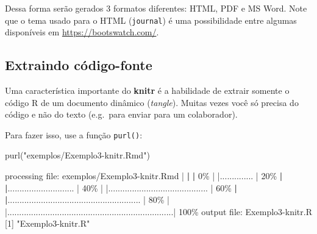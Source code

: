 \documentclass[
  10pt,
  a4paper]{book}
\newenvironment{Shaded}{\begin{snugshade}}{\end{snugshade}}
\newcommand{\DecValTok}[1]{\textcolor[rgb]{0.00,0.00,0.81}{#1}}
\newcommand{\ErrorTok}[1]{\textcolor[rgb]{0.64,0.00,0.00}{\textbf{#1}}}
\newcommand{\FunctionTok}[1]{\textcolor[rgb]{0.00,0.00,0.00}{#1}}
\newcommand{\NormalTok}[1]{#1}
\newcommand{\SpecialCharTok}[1]{\textcolor[rgb]{0.00,0.00,0.00}{#1}}
\newcommand{\StringTok}[1]{\textcolor[rgb]{0.31,0.60,0.02}{#1}}
\begin{document}
Dessa forma serão gerados 3 formatos diferentes: HTML, PDF e MS Word.
Note que o tema usado para o HTML (\texttt{journal}) é uma possibilidade entre
algumas disponíveis em \url{https://bootswatch.com/}.

\hypertarget{extraindo-cuxf3digo-fonte}{%
\subsection{Extraindo código-fonte}\label{extraindo-cuxf3digo-fonte}}

Uma característica importante do \textbf{knitr} é a habilidade de extrair
somente o código R de um documento dinâmico (\emph{tangle}). Muitas vezes
você só precisa do código e não do texto (e.g.~para enviar para um
colaborador).

Para fazer isso, use a função \texttt{purl()}:

\begin{Shaded}
\begin{Highlighting}[]
\FunctionTok{purl}\NormalTok{(}\StringTok{"exemplos/Exemplo3{-}knitr.Rmd"}\NormalTok{)}


\NormalTok{processing file}\SpecialCharTok{:}\NormalTok{ exemplos}\SpecialCharTok{/}\NormalTok{Exemplo3}\SpecialCharTok{{-}}\NormalTok{knitr.Rmd}
  \SpecialCharTok{|}                                                                              \ErrorTok{|}                                                                      \ErrorTok{|}   \DecValTok{0}\SpecialCharTok{\%  |                                                                              |..............                                                        |  20\%}  \ErrorTok{|}                                                                              \ErrorTok{|}\NormalTok{............................                                          }\SpecialCharTok{|}  \DecValTok{40}\SpecialCharTok{\%  |                                                                              |..........................................                            |  60\%}  \ErrorTok{|}                                                                              \ErrorTok{|}\NormalTok{........................................................              }\SpecialCharTok{|}  \DecValTok{80}\SpecialCharTok{\%  |                                                                              |......................................................................| 100\%}
\NormalTok{output file}\SpecialCharTok{:}\NormalTok{ Exemplo3}\SpecialCharTok{{-}}\NormalTok{knitr.R}
\NormalTok{[}\DecValTok{1}\NormalTok{] }\StringTok{"Exemplo3{-}knitr.R"}
\end{Highlighting}
\end{Shaded}
\end{document}
